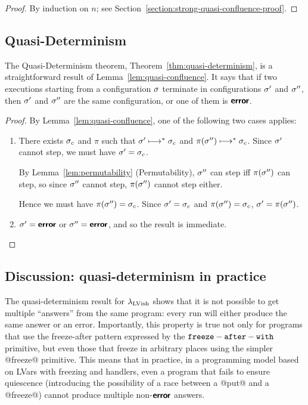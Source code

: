 \LemStrongQuasiConfluence
\begin{proof}
  By induction on $n$; see
  Section~\ref{section:strong-quasi-confluence-proof}.
\end{proof}

\LemQuasiConfluence
 
\subsection{Quasi-Determinism}\label{subsection:quasi-quasi-determinism}

The Quasi-Determinism theorem, Theorem~\ref{thm:quasi-determinism}, is
a straightforward result of Lemma~\ref{lem:quasi-confluence}.  It says
that if two executions starting from a configuration $\sigma$ terminate
in configurations $\sigma'$ and $\sigma''$, then $\sigma'$ and $\sigma''$
are the same configuration, or one of them is $\textbf{\textsf{error}}$.

\ThmQuasiDeterminism
\begin{proof}
  By Lemma~\ref{lem:quasi-confluence}, one of the following two cases
  applies:
  \begin{enumerate}
    \item There exists $\sigma_c$ and $\pi$ such that $\sigma'
      \longmapsto^* \sigma_c$ and $\pi(\sigma'') \longmapsto^* \sigma_c$.
      Since $\sigma'$ cannot step, we must have $\sigma' = \sigma_c$.

      By Lemma~\ref{lem:permutability} (Permutability), $\sigma''$ can
      step iff $\pi(\sigma'')$ can step, so since $\sigma''$ cannot
      step, $\pi(\sigma'')$ cannot step either.

      Hence we must have $\pi(\sigma'') = \sigma_c$.  Since $\sigma' =
      \sigma_c$ and $\pi(\sigma'') = \sigma_c$, $\sigma' = \pi(\sigma'')$.
    \item $\sigma' = \textbf{\textsf{error}}$ or $\sigma'' = \textbf{\textsf{error}}$, and so the result
      is immediate.
  \end{enumerate}
\end{proof}

\subsection{Discussion: quasi-determinism in practice}


The quasi-determinism result for $\lambda_{\textrm{LVish}}$ shows that it is not
possible to get multiple ``answers'' from the same program: every run
will either produce the same answer or an error.  Importantly, this
property is true not only for programs that use the freeze-after
pattern expressed by the ${\mbox{\texttt{freeze}}-\mbox{\texttt{after}}-\mbox{\texttt{with}}}$ primitive, but even those that freeze
in arbitrary places using the simpler @freeze@ primitive.  This means
that in practice, in a programming model based on LVars with freezing
and handlers, even a program that fails to ensure quiescence
(introducing the possibility of a race between a @put@ and a
@freeze@) cannot produce multiple non-$\textbf{\textsf{error}}$ answers.

